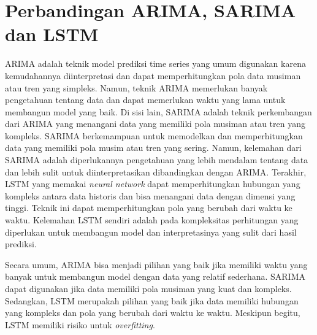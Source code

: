 \section{Perbandingan ARIMA, SARIMA dan LSTM}

ARIMA adalah teknik model prediksi time series yang umum digunakan karena kemudahannya diinterpretasi dan dapat memperhitungkan pola data musiman atau tren yang simpleks. Namun, teknik ARIMA memerlukan banyak pengetahuan tentang data dan dapat memerlukan waktu yang lama untuk membangun model yang baik. Di sisi lain, SARIMA adalah teknik perkembangan dari ARIMA yang menangani data yang memiliki pola musiman atau tren yang kompleks. SARIMA berkemampuan untuk memodelkan dan memperhitungkan data yang memiliki pola musim atau tren yang sering. Namun, kelemahan dari SARIMA adalah diperlukannya pengetahuan yang lebih mendalam tentang data dan lebih sulit untuk diinterpretasikan dibandingkan dengan ARIMA. Terakhir, LSTM yang memakai \textit{neural network} dapat memperhitungkan hubungan yang kompleks antara data historis dan bisa menangani data dengan dimensi yang tinggi. Teknik ini dapat memperhitungkan pola yang berubah dari waktu ke waktu. Kelemahan LSTM sendiri adalah pada kompleksitas perhitungan yang diperlukan untuk membangun model dan interpretasinya yang sulit dari hasil prediksi.

Secara umum, ARIMA bisa menjadi pilihan yang baik jika memiliki waktu yang banyak untuk membangun model dengan data yang relatif sederhana. SARIMA dapat digunakan jika data memiliki pola musiman yang kuat dan kompleks. Sedangkan, LSTM merupakah pilihan yang baik jika data memiliki hubungan yang kompleks dan pola yang berubah dari waktu ke waktu. Meskipun begitu, LSTM memiliki risiko untuk \textit{overfitting}.